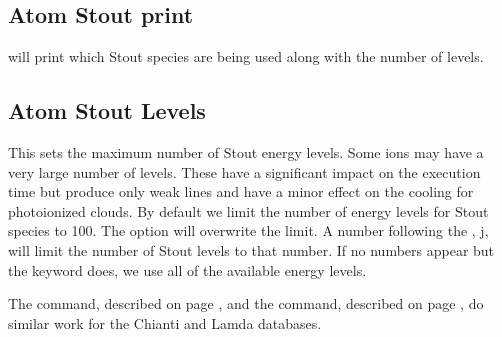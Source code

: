 \subsection{Atom Stout print} 
will print which Stout species are being used
along with the number of levels.

\subsection{Atom Stout Levels} 
This sets the maximum number of Stout energy levels. 
Some ions may have a very large number of levels.
These have a significant impact on the execution time but produce only weak lines and have a minor effect
on the cooling for photoionized clouds.
By default we limit the number of energy levels for Stout species to 100.
The  option will overwrite the limit.
A number following the , j, will limit the number of Stout levels to that number.
If no numbers appear but the keyword  does, we use all 
of the available energy levels.

The  command, described on page \pageref{sec:SetChianti},
and the  command, described on page \pageref{sec:SetLamda},
do similar work for the Chianti and Lamda databases.

